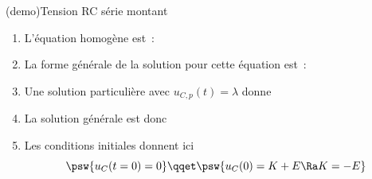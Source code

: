 \documentclass[../../main/main.tex]{subfiles}
\begin{document}
\begin{tcb*}[label=demo:rcsolu, breakable](demo){Tension RC série montant}
	\begin{enumerate}[label=\sqenumi]
		\item L'équation homogène est~:
		      \psw{%
		      \[
			      \dv{u_{C,h}}{t} + \frac{1}{\tau}u_{C,h} = 0
		      \]
		      }%
		      \vspace{-15pt}
		\item La forme générale de la solution pour cette équation est~:
		      \psw{%
			      \[
				      u_{C,h}(t) = K\exp\left( -\frac{t}{\tau} \right)
			      \]
		      }%
		      \vspace{-15pt}
		\item Une solution particulière avec $u_{C,p}(t) = \lambda$ donne
		\item La solution générale est donc
		      \psw{%
			      \[
				      u_C(t) = E + K\exp \left( - \frac{t}{\tau} \right)
			      \]
		      }%
		      \vspace{-15pt}
		\item Les conditions initiales donnent ici
		      \[
			      \psw{u_C(t=0) = 0}
			      \qqet
			      \psw{u_C(0) = K + E \Ra K=-E}
		      \]
	\end{enumerate}
\end{tcb*}
\end{document}
